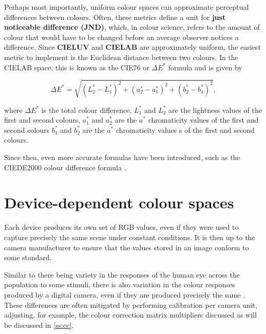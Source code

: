 Perhaps most importantly, uniform colour spaces can approximate perceptual differences between colours. Often, these metrics define a unit for \textbf{just noticeable difference (JND)}, which, in colour science, refers to the amount of colour that would have to be changed before an average observer notices a difference. Since \textbf{CIELUV} and \textbf{CIELAB} are approximately uniform, the easiest metric to implement is the Euclidean distance between two colours. In the CIELAB space, this is known as the CIE76 or $\Delta E^{*}$ formula and is given by

\begin{equation}
\label{eq:cie76}
\Delta E^* = \sqrt{(L_2^* - L_1^*)^2 + (a_2^* - a_1^*)^2 + (b_2^* - b_1^*)^2}
,
\end{equation}

where $\Delta E^*$ is the total colour difference, $L_1^*$ and $L_2^*$ are the lightness values of the first and second colours, 
$a_1^*$ and $a_2^*$ are the $a^*$ chromaticity values of the first and second colours
$b_1^*$  and $b_2^*$ are the $a^*$ chromaticity values s of the first and second colours.

Since then, even more accurate formulas have been introduced, such as the CIEDE2000 colour difference formula \cite{ciede2000dev}.

\section{Device-dependent colour spaces}

 Each device produces its own set of RGB values, even if they were used to capture precisely the same scene under constant conditions. It is then up to the camera manufacturer to ensure that the values stored in an image conform to some standard.
 
Similar to there being variety in the responses of the human eye across the population to some stimuli, there is also variation in the colour responses produced by a digital camera, even if they are produced precisely the same \cite{walowit2019best}. These differences are often mitigated by performing calibration per camera unit, adjusting, for example, the colour correction matrix multipliers discussed as will be discussed in \ref{ss:cc}.